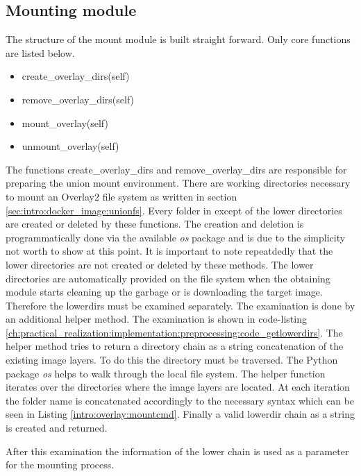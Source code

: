 \subsection{Mounting module}	
\label{ch:practical_realization:implementation:mount}
The structure of the mount module is built straight forward. Only core functions are listed below.
\begin{itemize}
\item create\_overlay\_dirs(self)
\item remove\_overlay\_dirs(self)
\item mount\_overlay(self)
\item unmount\_overlay(self)
\end{itemize}
The functions create\_overlay\_dirs and remove\_overlay\_dirs are responsible for preparing the union mount environment. 
There are working directories necessary to mount an Overlay2 file system as written in section \ref{sec:intro:docker_image:unionfs}.
Every folder in except of the lower directories are created or deleted by these functions. 
The creation and deletion is programmatically done via the available \textit{os} package and is due to the simplicity not worth to show at this point. 
It is important to note repeatdedly that the lower directories are not created or deleted by these methods. 
The lower directories are automatically provided on the file system when the obtaining module starts cleaning up the garbage or is downloading the target image.
Therefore the lowerdirs must be examined separately. The examination is done by an additional helper method. 
The examination is shown in code-listing \ref{ch:practical_realization:implementation:preprocessing:code_getlowerdirs}.
The helper method tries to return a directory chain as a string concatenation of the existing image layers.
To do this the directory must be traversed. 
The Python package \textit{os} helps to walk through the local file system. 
The helper function iterates over the directories where the image layers are located.
At each iteration the folder name is concatenated accordingly to the necessary syntax which can be seen in Listing \ref{intro:overlay:mountcmd}. 
Finally a valid lowerdir chain as a string is created and returned.

After this examination the information of the lower chain is used as a parameter for the mounting process.
